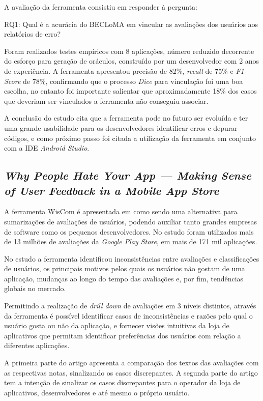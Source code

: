 A avaliação da ferramenta consistiu em responder à pergunta:

RQ1: Qual é a acurácia do BECLoMA em vincular as avaliações dos usuários aos relatórios de erro?

Foram realizados testes empíricos com 8 aplicações, número reduzido decorrente do esforço para geração de oráculos, construído por um desenvolvedor com 2 anos de experiência. A ferramenta apresentou precisão de 82\%, \textit{recall} de 75\% e \textit{F1-Score} de 78\%, confirmando que o processo \textit{Dice} para vinculação foi uma boa escolha, no entanto foi importante salientar que aproximadamente 18\% dos casos que deveriam ser vinculados a ferramenta não conseguiu associar.

A conclusão do estudo cita que a ferramenta pode no futuro ser evoluída e ter uma grande usabilidade para os desenvolvedores identificar erros e depurar códigos, e como próximo passo foi citada a utilização da ferramenta em conjunto com a IDE \textit{Android Studio}.

\subsection{\textit{Why People Hate Your App — Making Sense of User Feedback in a Mobile App Store}}

A ferramenta WisCom é apresentada em \cite{Fu2013whypeoplehate} como sendo uma alternativa para sumarizações de avaliações de usuários, podendo auxiliar tanto grandes empresas de software como os pequenos desenvolvedores. No estudo foram utilizados mais de 13 milhões de avaliações da \textit{Google Play Store}, em mais de 171 mil aplicações.

No estudo a ferramenta identificou inconsistências entre avaliações e classificações de usuários, os principais motivos pelos quais os usuários não gostam de uma aplicação, mudanças ao longo do tempo das avaliações e, por fim, tendências globais no mercado.

Permitindo a realização de \textit{drill down} de avaliações em 3 níveis distintos, através da ferramenta é possível identificar casos de inconsistências e razões pelo qual o usuário gosta ou não da aplicação, e fornecer visões intuitivas da loja de aplicativos que permitam identificar preferências dos usuários com relação a diferentes aplicações.

A primeira parte do artigo apresenta a comparação dos textos das avaliações com as respectivas notas, sinalizando os casos discrepantes.
A segunda parte do artigo tem a intenção de sinalizar os casos discrepantes para o operador da loja de aplicativos, desenvolvedores e até mesmo o próprio usuário.

